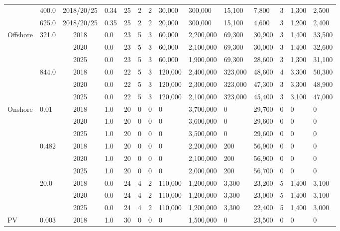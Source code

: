 \begin{table*}[]
\begin{tabularx}{1.0205\linewidth}{|l|l|c|l|l|l|l|l|l|l|l|l|l|l|}
	& 400.0 & 2018/20/25 & 0.34 & 25 & 2 & 2 & 30,000 & 300,000 & 15,100 & 7,800 & 3 & 1,300 & 2,500 \\ \cline{2-14} 
	& 625.0 & 2018/20/25 & 0.35 & 25 & 2 & 2 & 20,000 & 300,000 & 15,100 & 4,600 & 3 & 1,200 & 2,400 \\ \hline
	\multirow{6}{*}{Offshore} & \multirow{3}{*}{321.0} & 2018 & 0.0 & 23 & 5 & 3 & 60,000 & 2,200,000 & 69,300 & 30,900 & 3 & 1,400 & 33,500 \\ \cline{3-14} 
	&  & 2020 & 0.0 & 23 & 5 & 3 & 60,000 & 2,100,000 & 69,300 & 30,000 & 3 & 1,400 & 32,600 \\ \cline{3-14} 
	&  & 2025 & 0.0 & 23 & 5 & 3 & 60,000 & 1,900,000 & 69,300 & 28,600 & 3 & 1,300 & 31,100 \\ \cline{2-14} 
	& \multirow{3}{*}{844.0} & 2018 & 0.0 & 22 & 5 & 3 & 120,000 & 2,400,000 & 323,000 & 48,600 & 4 & 3,300 & 50,300 \\ \cline{3-14} 
	&  & 2020 & 0.0 & 22 & 5 & 3 & 120,000 & 2,300,000 & 323,000 & 47,300 & 3 & 3,300 & 48,900 \\ \cline{3-14} 
	&  & 2025 & 0.0 & 22 & 5 & 3 & 120,000 & 2,100,000 & 323,000 & 45,400 & 3 & 3,100 & 47,000 \\ \hline
	\multirow{9}{*}{Onshore} & \multirow{3}{*}{0.01} & 2018 & 1.0 & 20 & 0 & 0 & 0 & 3,700,000 & 0 & 29,700 & 0 & 0 & 0 \\ \cline{3-14} 
	&  & 2020 & 1.0 & 20 & 0 & 0 & 0 & 3,600,000 & 0 & 29,600 & 0 & 0 & 0 \\ \cline{3-14} 
	&  & 2025 & 1.0 & 20 & 0 & 0 & 0 & 3,500,000 & 0 & 29,600 & 0 & 0 & 0 \\ \cline{2-14} 
	& \multirow{3}{*}{0.482} & 2018 & 1.0 & 20 & 0 & 0 & 0 & 2,200,000 & 200 & 56,900 & 0 & 0 & 0 \\ \cline{3-14} 
	&  & 2020 & 1.0 & 20 & 0 & 0 & 0 & 2,100,000 & 200 & 56,900 & 0 & 0 & 0 \\ \cline{3-14} 
	&  & 2025 & 1.0 & 20 & 0 & 0 & 0 & 2,000,000 & 200 & 56,700 & 0 & 0 & 0 \\ \cline{2-14} 
	& \multirow{3}{*}{20.0} & 2018 & 0.0 & 24 & 4 & 2 & 110,000 & 1,200,000 & 3,300 & 23,200 & 5 & 1,400 & 3,100 \\ \cline{3-14} 
	&  & 2020 & 0.0 & 24 & 4 & 2 & 110,000 & 1,200,000 & 3,300 & 23,000 & 5 & 1,400 & 3,100 \\ \cline{3-14} 
	&  & 2025 & 0.0 & 24 & 4 & 2 & 110,000 & 1,200,000 & 3,300 & 22,400 & 5 & 1,400 & 3,000 \\ \hline
	\multirow{14}{*}{PV} & \multirow{3}{*}{0.003} & 2018 & 1.0 & 30 & 0 & 0 & 0 & 1,500,000 & 0 & 23,500 & 0 & 0 & 0 \\ \cline{3-14} 

\end{tabularx}
\end{table*}
